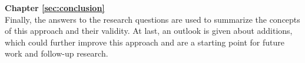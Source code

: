 \textbf{Chapter \ref{sec:conclusion}} \\[0.2em]
Finally, the answers to the research questions are used to summarize the concepts of this approach and their validity.
At last, an outlook is given about additions, which could further improve this approach and are a starting point for future work and follow-up research.
